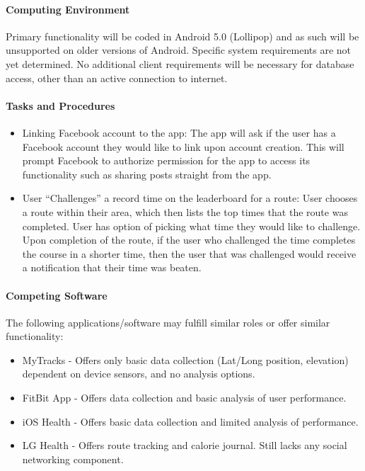\documentclass{article}
\begin{document}
\paragraph{Computing Environment}
Primary functionality will be coded in Android 5.0 (Lollipop) and as such will be unsupported on older versions of Android. Specific system requirements are not yet determined. No additional client requirements will be necessary for database access, other than an active connection to internet.

\paragraph{Tasks and Procedures}
\begin{itemize}
    \item Linking Facebook account to the app: The app will ask if the user has a Facebook account they would like to link upon account creation.
        \subitem This will prompt Facebook to authorize permission for the app to access its functionality such as sharing posts straight from the app.
    
    \item User “Challenges” a record time on the leaderboard for a route: User chooses a route within their area, which then lists the top times that the route was completed. 
        \subitem User has option of picking what time they would like to challenge.
        \subitem Upon completion of the route, if the user who challenged the time completes the course in a shorter time, then the user that was challenged would receive a notification that their time was beaten.
\end{itemize}

\paragraph{Competing Software}
The following applications/software may fulfill similar roles or offer similar functionality:
\begin{itemize}
    \item MyTracks - Offers only basic data collection (Lat/Long position, elevation) dependent on device sensors, and no analysis options.
    \item FitBit App - Offers data collection and basic analysis of user performance.
    \item iOS Health - Offers basic data collection and limited analysis of performance.
    \item LG Health - Offers route tracking and calorie journal. Still lacks any social networking component.
\end{itemize}
\end{document}
